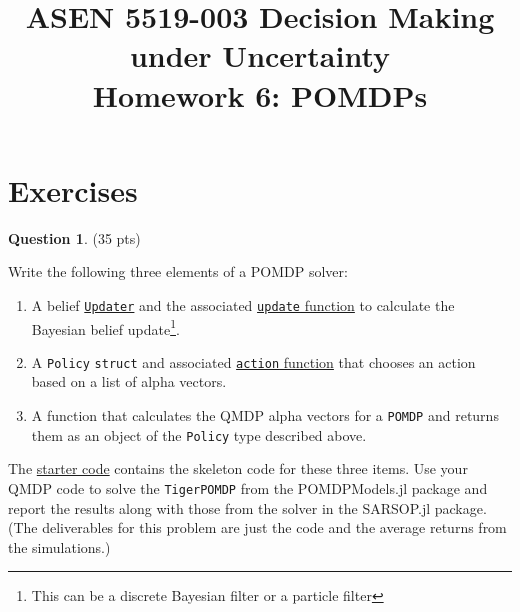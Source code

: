 \documentclass{article}
\title{ASEN 5519-003 Decision Making under Uncertainty\\
       Homework 6: POMDPs}
\theoremstyle{definition}
\newtheorem{question}[thm]{Question}
\begin{document}
\maketitle



\section{Exercises}

\begin{question} \label{q:tiger}
    (35 pts)

    Write the following three elements of a POMDP solver:
    \begin{enumerate}[noitemsep]
        \item A belief \href{https://juliapomdp.github.io/POMDPs.jl/stable/def_updater/}{\texttt{Updater}} and the associated \href{https://juliapomdp.github.io/POMDPs.jl/stable/api/#POMDPs.update}{\texttt{update} function} to calculate the Bayesian belief update\footnote{This can be a discrete Bayesian filter or a particle filter}.
        \item A \texttt{Policy} \texttt{struct} and associated \href{https://juliapomdp.github.io/POMDPs.jl/stable/api/#POMDPs.action}{\texttt{action} function} that chooses an action based on a list of alpha vectors.
        \item A function that calculates the QMDP alpha vectors for a \texttt{POMDP} and returns them as an object of the \texttt{Policy} type described above.
    \end{enumerate}
    The \href{https://github.com/zsunberg/CU-DMU-Materials/blob/master/hw/6-POMDPs/starter_code.jl}{starter code} contains the skeleton code for these three items. Use your QMDP code to solve the \texttt{TigerPOMDP} from the POMDPModels.jl package and report the results along with those from the solver in the SARSOP.jl package. (The deliverables for this problem are just the code and the average returns from the simulations.)
\end{question}
\end{document}
